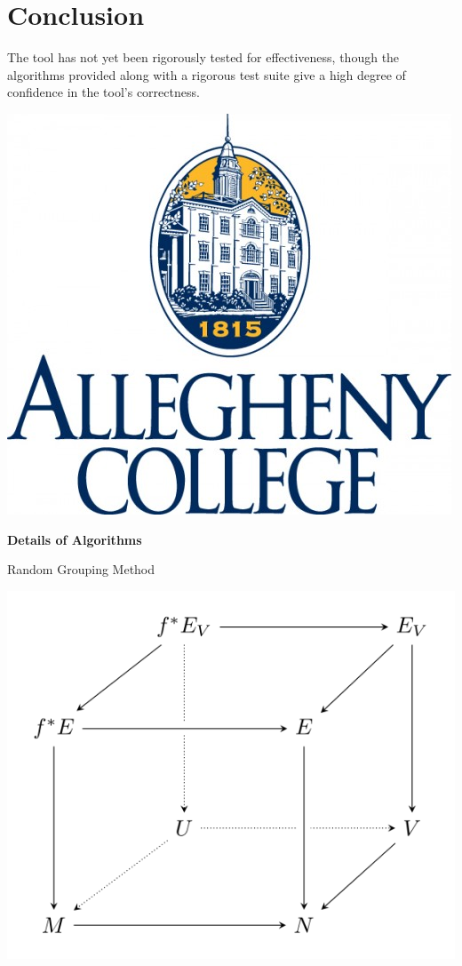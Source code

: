 \documentclass[a0paper,fleqn]{betterposter}
\begin{document}
{\section{Conclusion}
The tool has not yet been rigorously tested for effectiveness, though the
algorithms provided along with a rigorous test suite give a high degree of
confidence in the tool's correctness.

\vfill

\includegraphics[width=\textwidth]{img/aclogo.jpg}\\

}{

\textbf{Details of Algorithms}

Random Grouping Method
\begin{center}
\includegraphics[width=\textwidth]{img/tikzexample2}
\end{center}

}
\end{document}
